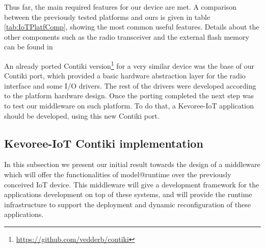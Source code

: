 Thus far, the main required features for our device are met.
A comparison between the previously tested platforms and ours is given in table \ref{tab:IoTPlatfComp}, showing the most common useful features.
Details about the other components such as the radio transceiver and the external flash memory can be found in 
	
An already ported Contiki version\footnote{\url{https://github.com/vedderb/contiki}} for a very similar device was the base of our Contiki port, which provided a basic hardware abstraction layer for the radio interface and some I/O drivers.
The rest of the drivers were developed according to the platform hardware design.
Once the porting completed the next step was to test our middleware on such platform.
To do that, a Kevoree-IoT application should be developed, using this new Contiki port.


\subsection{Kevoree-IoT Contiki implementation}
\label{subsec:kevoreeContikiImpl}
In this subsection we present our initial result towards the design of a middleware which will offer the functionalities of model@runtime over the previously conceived IoT device. 
This middleware will give a development framework for the  applications development on top of these systems, and will provide the runtime infrastructure to support the deployment and dynamic reconfiguration of these applications.



